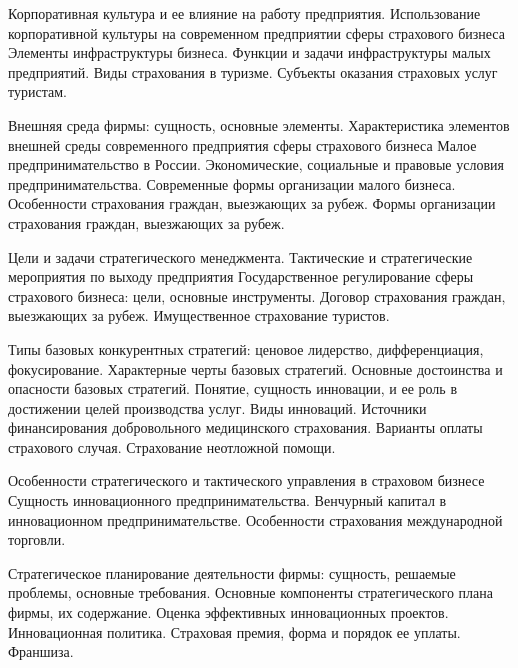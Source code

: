 \documentclass[
	11pt,
	a4paper,
	]
	{article}
\begin{document}
\bigskip

\noindent{} 
	{
		Корпоративная культура и ее влияние на работу предприятия. Использование корпоративной культуры на современном предприятии сферы страхового бизнеса
	}{
		Элементы инфраструктуры бизнеса. Функции и задачи инфраструктуры малых предприятий.
	}{
		Виды страхования в туризме. Субъекты оказания страховых услуг туристам.
	}

\bigskip

\noindent{} 
	{
		Внешняя среда фирмы: сущность, основные элементы. Характеристика элементов внешней среды современного предприятия сферы страхового бизнеса
	}{
		Малое предпринимательство в России. Экономические, социальные и правовые условия предпринимательства. Современные формы организации малого бизнеса.
	}{
		Особенности страхования граждан, выезжающих за рубеж. Формы организации страхования граждан, выезжающих за рубеж.
	}

\bigskip

\noindent{} 
	{
		Цели и задачи стратегического менеджмента. Тактические и стратегические мероприятия по выходу предприятия
	}{
		Государственное регулирование сферы страхового бизнеса: цели, основные инструменты.
	}{
		Договор страхования граждан, выезжающих за рубеж. Имущественное страхование туристов.
	}

\bigskip

\noindent{} 
	{
		Типы базовых конкурентных стратегий: ценовое лидерство, дифференциация, фокусирование. Характерные черты базовых стратегий. Основные достоинства и опасности базовых стратегий.
	}{
		Понятие, сущность инновации, и ее роль в достижении целей производства услуг. Виды инноваций.
	}{
		Источники финансирования добровольного медицинского страхования. Варианты оплаты страхового случая. Страхование неотложной помощи.
	}

\bigskip

\noindent{} 
	{
		Особенности стратегического и тактического управления в страховом бизнесе
	}{
		Сущность инновационного предпринимательства. Венчурный капитал в инновационном предпринимательстве.
	}{
		Особенности страхования международной торговли.
	}

\bigskip

\noindent{} 
	{
		Стратегическое планирование деятельности фирмы: сущность, решаемые проблемы, основные требования. Основные компоненты стратегического плана фирмы, их содержание.
	}{
		Оценка эффективных инновационных проектов. Инновационная политика.
	}{
		Страховая премия, форма и порядок ее уплаты. Франшиза.
	}
\end{document}

